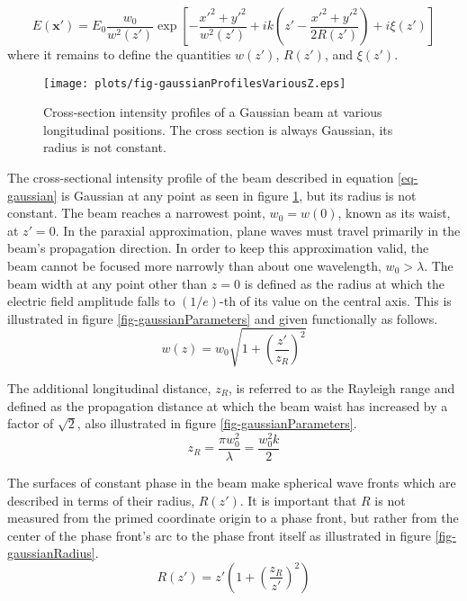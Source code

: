 \documentclass[12pt]{uthesis-v12}
\begin{document}
\begin{equation}\label{eq-gaussian}
E(\mathbf{x'})=E_0\frac{w_0}{w^2(z')}\exp\left[
-\frac{x'^2+y'^2}{w^2(z')}+ik\left(z'-\frac{x'^2+y'^2}{2R(z')}\right)+i\xi(z')
\right]
\end{equation}
where it remains to define the quantities $w(z')$, $R(z')$, and $\xi(z')$.

\begin{figure}[htb]
\centering
\texttt{[image: plots/fig-gaussianProfilesVariousZ.eps]}
\caption[Cross-section intensity profiles of a Gaussian beam.]{Cross-section intensity profiles of a Gaussian beam at various longitudinal positions. The cross section is always Gaussian, its radius is not constant.
 \label{fig-gaussianProfilesVariousZ}}
\end{figure}

The cross-sectional intensity profile of the beam described in equation \ref{eq-gaussian} is Gaussian at any point as seen in figure \ref{fig-gaussianProfilesVariousZ}, but its radius is not constant. The beam reaches a narrowest point, $w_0=w(0)$, known as its waist, at $z'=0$.  In the paraxial approximation, plane waves must travel primarily in the beam's propagation direction. In order to keep this approximation valid, the beam cannot be focused more narrowly than about one wavelength, $w_0>\lambda$. The beam width at any point other than $z=0$ is defined as the radius at which the electric field amplitude falls to $(1/e)$-th of its value on the central axis. This is illustrated in figure \ref{fig-gaussianParameters} and given functionally as follows.
\begin{equation}\label{eq-beamWidth}
w(z)=w_0\sqrt{1+\left(\frac{z'}{z_R}\right)^2}
\end{equation}

The additional longitudinal distance, $z_R$, is referred to as the Rayleigh range and defined as the propagation distance at which the beam waist has increased by a factor of $\sqrt{2}$, also illustrated in figure \ref{fig-gaussianParameters}.
\begin{equation}\label{eq-rayleighRange}
z_R=\frac{\pi w_0^2}{\lambda}=\frac{w_0^2k}{2}
\end{equation}

The surfaces of constant phase in the beam make spherical wave fronts which are described in terms of their radius, $R(z')$. It is important that $R$ is not measured from the primed coordinate origin to a phase front, but rather from the center of the phase front's arc to the phase front itself as illustrated in figure \ref{fig-gaussianRadius}.
\begin{equation}\label{eq-curvatureRadius}
R(z')=z'\left(1+\left(\frac{z_R}{z'}\right)^2\right)
\end{equation}
\end{document}
